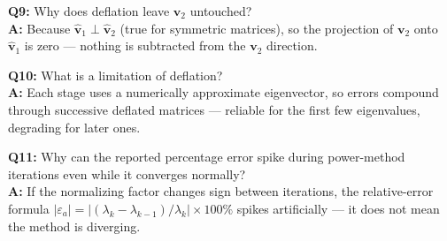 \begin{qabox}
\textbf{Q9:} Why does deflation leave $\mathbf v_2$ untouched? \\
\textbf{A:} Because $\hat{\mathbf v}_1\perp\hat{\mathbf v}_2$ (true for symmetric matrices), so the projection of $\mathbf v_2$ onto $\hat{\mathbf v}_1$ is zero — nothing is subtracted from the $\mathbf v_2$ direction.

\textbf{Q10:} What is a limitation of deflation? \\
\textbf{A:} Each stage uses a numerically approximate eigenvector, so errors compound through successive deflated matrices — reliable for the first few eigenvalues, degrading for later ones.

\textbf{Q11:} Why can the reported percentage error spike during power-method iterations even while it converges normally? \\
\textbf{A:} If the normalizing factor changes sign between iterations, the relative-error formula $|\varepsilon_a|=|(\lambda_k-\lambda_{k-1})/\lambda_k|\times100\%$ spikes artificially — it does not mean the method is diverging.
\end{qabox}
